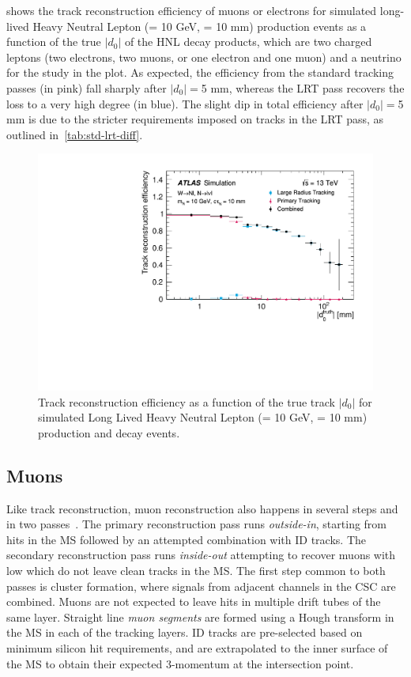  shows the track reconstruction efficiency of muons or electrons for simulated long-lived Heavy Neutral Lepton (\mhnl = 10 GeV, \ctau = 10 mm) production events as a function of the true $|d_0|$ of the HNL decay products, which are two charged leptons (two electrons, two muons, or one electron and one muon) and a neutrino for the study in the plot. As expected, the efficiency from the standard tracking passes (in pink) fall sharply after $|d_0|=$5 mm, whereas the LRT pass recovers the loss to a very high degree (in blue). The slight dip in total efficiency after $|d_0|=$5 mm is due to the stricter requirements imposed on tracks in the LRT pass, as outlined in~\cref{tab:std-lrt-diff}.

\begin{figure}[!ht]
    \centering
    \includegraphics[width=0.8\linewidth]{figures//experiment/track-eff-HNL.pdf}
    \caption{Track reconstruction efficiency as a function of the true track $|d_0|$ for simulated Long Lived Heavy Neutral Lepton (\mhnl = 10 GeV, \ctau = 10 mm) production and decay events.~\cite{IDTR-2021-03}}
    \label{fig:track-reco-eff-HNL}
\end{figure}


\subsection{Muons}
Like track reconstruction, muon reconstruction also happens in several steps and in two passes~\cite{MUON-2018-03}. The primary reconstruction pass runs \textit{outside-in}, starting from hits in the MS followed by an attempted combination with ID tracks. The secondary reconstruction pass runs \textit{inside-out} attempting to recover muons with low \pT which do not leave clean tracks in the MS. The first step common to both passes is cluster formation, where signals from adjacent channels in the CSC are combined. Muons are not expected to leave hits in multiple drift tubes of the same layer. Straight line \textit{muon segments} are formed using a Hough transform in the MS in each of the tracking layers. ID tracks are pre-selected based on minimum silicon hit requirements, and are extrapolated to the inner surface of the MS to obtain their expected 3-momentum at the intersection point.

